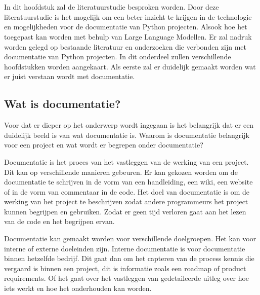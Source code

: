 \chapter{}%
\label{ch:stand-van-zaken}



In dit hoofdstuk zal de literatuurstudie besproken worden. Door deze literatuurstudie is het mogelijk om een beter inzicht te krijgen in de technologie en mogelijkheden voor de documentatie van Python projecten. 
Alsook hoe het toegepast kan worden met behulp van Large Language Modellen. Er
zal nadruk worden gelegd op bestaande literatuur en onderzoeken die verbonden
zijn met documentatie van Python projecten. In dit onderdeel zullen verschillende hoofdstukken worden aangekaart. 
Als eerste zal er duidelijk gemaakt worden wat er juist verstaan wordt met documentatie. 

\section{Wat is documentatie?}
\label{sec:wat-is-documentatie}

Voor dat er dieper op het onderwerp wordt ingegaan is het belangrijk dat er een duidelijk beeld is van wat documentatie is. 
Waarom is documentatie belangrijk voor een project en wat wordt er begrepen onder documentatie? 

Documentatie is het proces van het vastleggen van de werking van een project.
Dit kan op verschillende manieren gebeuren. 
Er kan gekozen worden om de documentatie te schrijven in de vorm van een handleiding, een wiki, een website of in de vorm van commentaar in de code.
Het doel van documentatie is om de werking van het project te beschrijven zodat andere programmeurs het project kunnen begrijpen en gebruiken.
Zodat er geen tijd verloren gaat aan het lezen van de code en het begrijpen ervan.

Documentatie kan gemaakt worden voor verschillende doelgroepen. Het kan voor interne of externe doeleinden zijn.
Interne documentatie is voor documentatie binnen hetzelfde bedrijf.
Dit gaat dan om het capteren van de process kennis die vergaard is binnen een project, dit is informatie zoals een roadmap of product requirements. 
Of het gaat over het vastleggen van gedetaileerde uitleg over hoe iets werkt en hoe het onderhouden kan worden.

